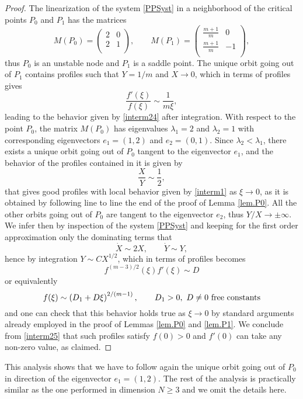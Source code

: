 \documentclass[a4paper,11pt]{article}
\numberwithin{equation}{section}
\begin{document}
\begin{proof}
The linearization of the system \eqref{PPSyst} in a neighborhood of the critical points $P_0$ and $P_1$ has the matrices
$$
M(P_0)=\left(
         \begin{array}{cc}
           2 & 0 \\
           2 & 1\\
         \end{array}
       \right), \qquad
M(P_1)=\left(
         \begin{array}{cc}
           \frac{m+1}{m} & 0 \\
           \frac{m+1}{m} & -1 \\
         \end{array}
       \right),
$$
thus $P_0$ is an unstable node and $P_1$ is a saddle point. The unique orbit going out of $P_1$ contains profiles such that $Y=1/m$ and $X\to0$, which in terms of profiles gives
$$
\frac{f'(\xi)}{f(\xi)}\sim\frac{1}{m\xi},
$$
leading to the behavior given by \eqref{interm24} after integration. With respect to the point $P_0$, the matrix $M(P_0)$ has eigenvalues $\lambda_1=2$ and $\lambda_2=1$ with corresponding eigenvectors $e_1=(1,2)$ and $e_2=(0,1)$. Since $\lambda_2<\lambda_1$, there exists a unique orbit going out of $P_0$ tangent to the eigenvector $e_1$, and the behavior of the profiles contained in it is given by
$$
\frac{X}{Y}\sim\frac{1}{2},
$$
that gives good profiles with local behavior given by \eqref{interm1} as $\xi\to0$, as it is obtained by following line to line the end of the proof of Lemma \ref{lem.P0}. All the other orbits going out of $P_0$ are tangent to the eigenvector $e_2$, thus $Y/X\to\pm\infty$. We infer then by inspection of the system \eqref{PPSyst} and keeping for the first order approximation only the dominating terms that
$$
\dot{X}\sim2X, \qquad \dot{Y}\sim Y,
$$
hence by integration $Y\sim CX^{1/2}$, which in terms of profiles becomes
$$
f^{(m-3)/2}(\xi)f'(\xi)\sim D
$$
or equivalently
\begin{equation}\label{interm25}
f(\xi)\sim\left(D_1+D\xi\right)^{2/(m-1)}, \qquad D_1>0, \ D\neq0 \ {\rm free \ constants}
\end{equation}
and one can check that this behavior holds true as $\xi\to0$ by standard arguments already employed in the proof of Lemmas \ref{lem.P0} and \ref{lem.P1}. We conclude from \eqref{interm25} that such profiles satisfy $f(0)>0$ and $f'(0)$ can take any non-zero value, as claimed.
\end{proof}
This analysis shows that we have to follow again the unique orbit going out of $P_0$ in direction of the eigenvector $e_1=(1,2)$. The rest of the analysis is practically similar as the one performed in dimension $N\geq3$ and we omit the details here.
\end{document}

